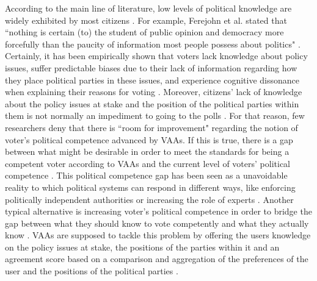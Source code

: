 \documentclass{scrartcl}
\begin{document}
According to the main line of literature, low levels of political knowledge are widely exhibited by most citizens  \cite{carpini1996americans}. For example, Ferejohn et al. stated that ``nothing is certain (to) the student of public opinion and democracy more forcefully than the paucity of information most people possess about politics" \cite[3]{ferejohn1990information}. Certainly, it has been empirically shown that voters lack knowledge about policy issues, suffer predictable biases due to their lack of information regarding how they place political parties in these issues, and experience cognitive dissonance when explaining their reasons for voting \cite{caplan2011myth}. Moreover, citizens' lack of knowledge about the policy issues at stake and the position of the political parties within them is not normally an impediment to going to the polls \cite{hardin2006ignorant}. For that reason, few researchers deny that there is ``room for improvement" \cite [245]{fossen2014s} regarding the notion of voter's political competence advanced by VAAs. If this is true, there is a gap between what might be desirable in order to meet the standards for being a competent voter according to VAAs and the current level of voters' political competence  \cite{fossen2015electoral}. This political competence gap has been seen as a unavoidable reality to which political systems can respond in different ways, like enforcing politically independent authorities or increasing the role of experts \cite{caplan2011myth}. Another typical alternative is increasing voter's political competence in order to bridge the gap between what they should know to vote competently and what they actually know \cite{dahl1992problem}. VAAs are supposed to tackle this problem by offering the users knowledge on the policy issues at stake, the positions of the parties within it and an agreement score based on a comparison and aggregation of the preferences of the user and the positions of the political parties \cite{fossen2014s}.
\\
\end{document}
